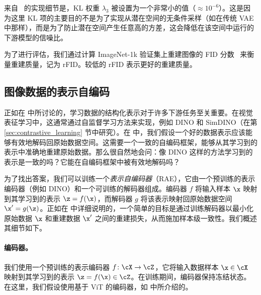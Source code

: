 \documentclass[../../book-main_zh.tex]{subfiles}
\begin{document}
来自~\citep{rombach2022high} 的实现细节是，KL 权重 $\lambda_3$ 被设置为一个非常小的值（$\approx 10^{-6}$）。这是因为这里 KL 项的主要目的不是为了实现从潜在空间的无条件采样（如在传统 VAE 中那样），而是为了防止潜在空间产生任意高的方差，这会降低在该空间中运行的下游模型的信噪比。

为了进行评估，我们通过计算 ImageNet-1k 验证集上重建图像的 FID 分数~\citep{heusel2017gans} 来衡量重建质量，记为 rFID。较低的 rFID 表示更好的重建质量。








\subsection{图像数据的表示自编码}
\label{sec:RAE-implement}

\newcommand{\gc}[1]{\textcolor{deemph}{#1}}
\newcommand{\tablestyle}[2]{\setlength{\tabcolsep}{#1}\renewcommand{\arraystretch}{#2}\centering\scriptsize}



正如在  中所讨论的，学习数据的结构化表示对于许多下游任务至关重要。在视觉表征学习中，这通常通过自监督学习方法来实现，例如 DINO \cite{caron2021emerging} 和 SimDINO（在第 \ref{sec:contrastive_learning} 节中研究）。在  中，我们假设一个好的数据表示应该能够有效地解码回原始数据空间。这需要一个一致的自编码框架，能够从其学习到的表示中准确地重建原始数据。那么很自然地会问：像 DINO 这样的方法学习到的表示是一致的吗？它能在自编码框架中被有效地解码吗？

为了找出答案，我们可以训练一个\textit{表示自编码器}（RAE），它由一个预训练的表示编码器（例如 DINO）和一个可训练的解码器组成。编码器 $f$ 将输入样本 $\x$ 映射到其学习到的表示 $\z = f(\x)$，而解码器 $g$ 将该表示映射回原始数据空间 $\x'=g(\z)$。正如在  中详细说明的，一个简单的目标是通过训练解码器以最小化原始数据 $\x$ 和重建数据 $\x'$ 之间的重建损失，从而施加样本级一致性。我们概述其细节如下。

\paragraph{编码器。} 我们使用一个预训练的表示编码器 $f \colon \cX \to \cZ$，它将输入数据样本 $\x \in \cX$ 映射到其学习到的表示 $\z = f(\x) \in \cZ$。在训练期间，编码器保持冻结状态。在这里，我们假设使用基于 ViT 的编码器，如  中所介绍的。
\end{document}
